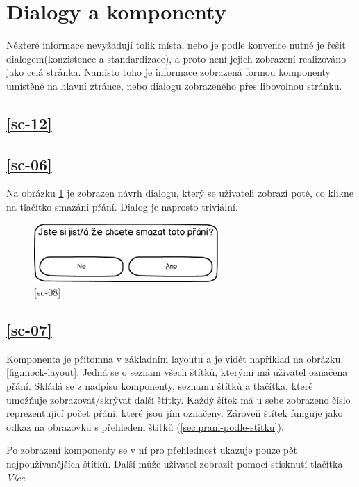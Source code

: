 \section{Dialogy a komponenty}
Některé informace nevyžadují tolik místa, nebo je podle konvence nutné je řešit dialogem(konzistence a standardizace\cite{molich1990improving}), a proto není jejich zobrazení realizováno jako celá stránka. Namísto toho je informace zobrazená formou komponenty umístěné na hlavní ztránce, nebo dialogu zobrazeného přes libovolnou stránku.

\subsection{\ref{sc-12}}

\subsection{\ref{sc-06}}
Na obrázku \ref{fig:dialog-mazani-prani} je zobrazen návrh dialogu, který se uživateli zobrazí poté, co klikne na tlačítko smazání přání. Dialog je naprosto triviální.

\begin{figure}[htb]
\begin{center}
\includegraphics[width=70mm]{./pictures/mock/dialog-mazani-prani.png}
\caption{\ref{sc-08}}
\label{fig:dialog-mazani-prani}
\end{center}
\end{figure}

\subsection{\ref{sc-07}}
Komponenta je přítomna v základním layoutu a je vidět například na obrázku \ref{fig:mock-layout}. Jedná se o seznam všech štítků, kterými má uživatel označena přání. Skládá se z nadpisu komponenty, seznamu štítků a tlačítka, které umožňuje zobrazovat/skrývat další štítky. Každý šítek má u sebe zobrazeno číslo reprezentující počet přání, které jsou jím označeny. Zároveň štítek funguje jako odkaz na obrazovku s přehledem štítků (\ref{sec:prani-podle-stitku}).

Po zobrazení komponenty se v ní pro přehlednost ukazuje pouze pět nejpoužívanějších štítků. Další může uživatel zobrazit pomocí stisknutí tlačítka \emph{Více}.

